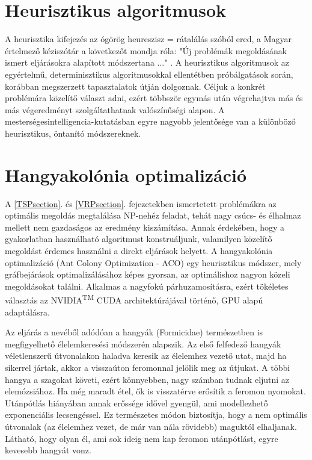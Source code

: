 \section{Heurisztikus algoritmusok}
A heurisztika kifejezés az ógörög heureszisz = rátalálás szóból ered, a Magyar értelmező kéziszótár a következőt mondja róla: "Új problémák megoldásának ismert eljárásokra alapított módszertana ..." \cite{HeurisztikaJelenteseKeziszotar}. A heurisztikus algoritmusok az egyértelmű, determinisztikus algoritmusokkal ellentétben próbálgatások során, korábban megszerzett tapasztalatok útján dolgoznak. Céljuk a konkrét problémára közelítő választ adni, ezért többször egymás után végrehajtva más és más végeredményt szolgáltathatnak valószínűségi alapon. A mesterségesintelligencia-kutatásban egyre nagyobb jelentősége van a különböző heurisztikus, öntanító módszereknek.

\section{Hangyakolónia optimalizáció}
A \ref{TSPsection}. és \ref{VRPsection}. fejezetekben ismertetett problémákra az optimális megoldás megtalálása NP-nehéz feladat, tehát nagy csúcs- és élhalmaz mellett nem gazdaságos az eredmény kiszámítása. Annak érdekében, hogy a gyakorlatban használható algoritmust konstruáljunk, valamilyen közelítő megoldást érdemes használni a direkt eljárások helyett. A hangyakolónia optimalizáció (Ant Colony Optimization - ACO) egy heurisztikus módszer, mely gráfbejárások optimalizálásához képes gyorsan, az optimálishoz nagyon közeli megoldásokat találni. Alkalmas a nagyfokú párhuzamosításra, ezért tökéletes választás az NVIDIA\textsuperscript{TM} CUDA architektúrájával történő, GPU alapú adaptálásra.

Az eljárás a nevéből adódóan a hangyák (Formicidae) természetben is megfigyelhető élelemkeresési módszerén alapszik. Az első felfedező hangyák véletlenszerű útvonalakon haladva keresik az élelemhez vezető utat, majd ha sikerrel jártak, akkor a visszaúton feromonnal jelölik meg az útjukat. A többi hangya a szagokat követi, ezért könnyebben, nagy számban tudnak eljutni az elemózsiához. Ha még maradt étel, ők is visszatérve erősítik a feromon nyomokat. Utánpótlás hiányában annak erőssége idővel gyengül, ami modellezhető exponenciális lecsengéssel. Ez természetes módon biztosítja, hogy a nem optimális útvonalak (az élelemhez vezet, de már van nála rövidebb) maguktól elhaljanak. Látható, hogy olyan él, ami sok ideig nem kap feromon utánpótlást, egyre kevesebb hangyát vonz.

